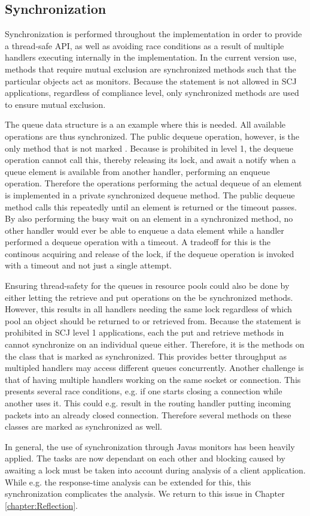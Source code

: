 \subsection{Synchronization} %
\label{sub:synchronization}
Synchronization is performed throughout the implementation in order to provide a thread-safe API, as well as avoiding race conditions as a result of multiple handlers executing internally in the implementation. In the current version use, methods that require mutual exclusion are synchronized methods such that the particular objects act as monitors. Because the  statement is not allowed in SCJ applications, regardless of compliance level, only synchronized methods are used to ensure mutual exclusion.

The queue data structure is a an example where this is needed. All available operations are thus synchronized. The public dequeue operation, however, is the only method that is not marked . Because  is prohibited in level 1, the dequeue operation cannot call this, thereby releasing its lock, and await a notify  when a queue element is available from another handler, performing an enqueue operation. Therefore the operations performing the actual dequeue of an element is implemented in a private synchronized dequeue method. The public dequeue method calls this repeatedly until an element is returned or the timeout passes. By also performing the busy wait on an element in a synchronized method, no other handler would ever be able to enqueue a data element while a handler performed a dequeue operation with a timeout. A tradeoff for this is the continous acquiring and release of the lock, if the dequeue operation is invoked with a timeout and not just a single attempt.

Ensuring thread-safety for the queues in resource pools could also be done by either letting the retrieve and put operations on the  be synchronized methods. However, this results in all handlers needing the same lock regardless of which pool an object should be returned to or retrieved from. Because the  statement is prohibited in SCJ level 1 applications, each the put and retrieve methods in  cannot synchronize on an individual queue either. Therefore, it is the methods on the  class that is marked as synchronized. This provides better throughput as multipled handlers may access different queues concurrently. Another challenge is that of having multiple handlers working on the same socket or connection. This presents several race conditions, e.g. if one starts closing a connection while another uses it. This could e.g. result in the routing handler putting incoming packets into an already closed connection. Therefore several methods on these classes are marked as synchronized as well.

In general, the use of synchronization through Javas monitors has been heavily applied. The tasks are now dependant on each other and blocking caused by awaiting a lock must be taken into account during analysis of a client application. While e.g. the response-time analysis can be extended for this\cite{alan2001real}, this synchronization complicates the analysis. We return to this issue in Chapter \ref{chapter:Reflection}.